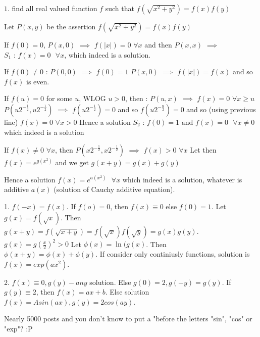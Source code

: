 \begin{solution}
	\begin{tcolorbox}$1.$ find all real valued function $f$ such that $f(\sqrt{x^2+y^2})=f(x)f(y)$\end{tcolorbox}
Let $P(x,y)$ be the assertion $f(\sqrt{x^2+y^2})=f(x)f(y)$

If $f(0)=0$, $P(x,0)$ $\implies$ $f(|x|)=0$ $\forall x$ and then $P(x,x)$ $\implies$ $\boxed{S_1\text{  :  }f(x)=0\text{  }\forall x}$, which indeed is a solution.

If $f(0)\ne 0$ :
$P(0,0)$ $\implies$ $f(0)=1$
$P(x,0)$ $\implies$ $f(|x|)=f(x)$ and so $f(x)$ is even.

If $f(u)=0$ for some $u$, WLOG $u>0$, then :
$P(u,x)$ $\implies$ $f(x)=0$ $\forall x\ge u$
$P(u2^{-\frac 12},u2^{-\frac 12})$ $\implies$ $f(u2^{-\frac 12})=0$ and so $f(u2^{-\frac n2})=0$ and so (using previous line) $f(x)=0$ $\forall x>0$
Hence a solution $\boxed{S_2\text{  :  }f(0)=1\text{  and  }f(x)=0\text{  }\forall x\ne 0}$ which indeed is a solution

If $f(x)\ne 0$ $\forall x$, then $P(x2^{-\frac 12},x2^{-\frac 12})$ $\implies$ $f(x)>0$ $\forall x$
Let then $f(x)=e^{g(x^2)}$ and we get $g(x+y)=g(x)+g(y)$

Hence a solution $\boxed{f(x)=e^{a(x^2)}\text{  }\forall x}$ which indeed is a solution, whatever is additive $a(x)$ (solution of Cauchy additive equation).
\end{solution}



\begin{solution}
	1. $f(-x)=f(x)$. If $f(o)=0$, then $f(x)\equiv 0$ else $f(0)=1$.
Let $g(x)=f(\sqrt x)$. Then $g(x+y)=f(\sqrt{x+y})=f(\sqrt x)f(\sqrt y)=g(x)g(y)$. $g(x)=g(\frac x2)^2>0$
Let $\phi(x)=\ln(g(x)$. Then $\phi(x+y)=\phi(x)+\phi(y)$. If consider only continiusly functions, solution is $f(x)=exp(ax^2)$.

2. $f(x)\equiv 0, g(y)- any$ solution.
Else $g(0)=2, g(-y)=g(y)$.
If $g(y)\equiv 2$, then $f(x)=ax+b$.
Else solution $f(x)=Asin(ax),g(y)=2cos(ay)$.
\end{solution}



\begin{solution}
	Nearly 5000 posts and you don't know to put a "\" before the letters "sin", "cos" or "exp"?  :P
\end{solution}



